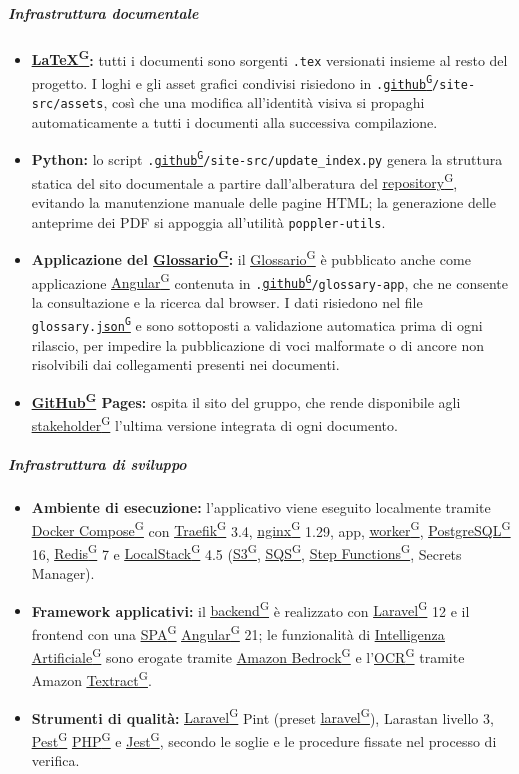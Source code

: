 \documentclass[a4paper,12pt]{article}
\providecommand{\glslink}[2]{\href{https://alittlebyte-19.github.io/Documentazione/glossario.html\#gls-#1}{\underline{#2}\textsuperscript{\scriptsize G}}}
\begin{document}
\subparagraph{Infrastruttura documentale}
\begin{itemize}
    \item \textbf{\glslink{latex}{LaTeX}:} tutti i documenti sono sorgenti \texttt{.tex} versionati insieme al resto del progetto. I loghi e gli asset grafici condivisi risiedono in \texttt{.\glslink{github}{github}/site-src/assets}, così che una modifica all'identità visiva si propaghi automaticamente a tutti i documenti alla successiva compilazione.
    \item \textbf{Python:} lo script \texttt{.\glslink{github}{github}/site-src/update\_index.py} genera la struttura statica del sito documentale a partire dall'alberatura del \glslink{repository}{repository}, evitando la manutenzione manuale delle pagine HTML; la generazione delle anteprime dei PDF si appoggia all'utilità \texttt{poppler-utils}.
    \item \textbf{Applicazione del \glslink{glossario}{Glossario}:} il \glslink{glossario}{Glossario} è pubblicato anche come applicazione \glslink{angular}{Angular} contenuta in \texttt{.\glslink{github}{github}/glossary-app}, che ne consente la consultazione e la ricerca dal browser. I dati risiedono nel file \texttt{glossary.\glslink{json}{json}} e sono sottoposti a validazione automatica prima di ogni rilascio, per impedire la pubblicazione di voci malformate o di ancore non risolvibili dai collegamenti presenti nei documenti.
    \item \textbf{\glslink{github}{GitHub} Pages:} ospita il sito del gruppo, che rende disponibile agli \glslink{stakeholder}{stakeholder} l'ultima versione integrata di ogni documento.
\end{itemize}

\subparagraph{Infrastruttura di sviluppo}
\begin{itemize}
    \item \textbf{Ambiente di esecuzione:} l'applicativo viene eseguito localmente tramite \glslink{docker-compose}{Docker Compose} con \glslink{traefik}{Traefik} 3.4, \glslink{nginx}{nginx} 1.29, app, \glslink{worker}{worker}, \glslink{postgresql}{PostgreSQL} 16, \glslink{redis}{Redis} 7 e \glslink{localstack}{LocalStack} 4.5 (\glslink{s3-simple-storage-service}{S3}, \glslink{sqs-simple-queue-service}{SQS}, \glslink{step-functions}{Step Functions}, Secrets Manager).
    \item \textbf{Framework applicativi:} il \glslink{backend}{backend} è realizzato con \glslink{laravel}{Laravel} 12 e il frontend con una \glslink{spa-single-page-application}{SPA} \glslink{angular}{Angular} 21; le funzionalità di \glslink{intelligenza-artificiale-ai}{Intelligenza Artificiale} sono erogate tramite \glslink{amazon-bedrock}{Amazon Bedrock} e l'\glslink{ocr-riconoscimento-ottico-dei-caratteri}{OCR} tramite Amazon \glslink{textract}{Textract}.
    \item \textbf{Strumenti di qualità:} \glslink{laravel}{Laravel} Pint (preset \glslink{laravel}{laravel}), Larastan livello 3, \glslink{pest}{Pest} \glslink{php}{PHP} e \glslink{jest}{Jest}, secondo le soglie e le procedure fissate nel processo di verifica.
\end{itemize}
\end{document}
